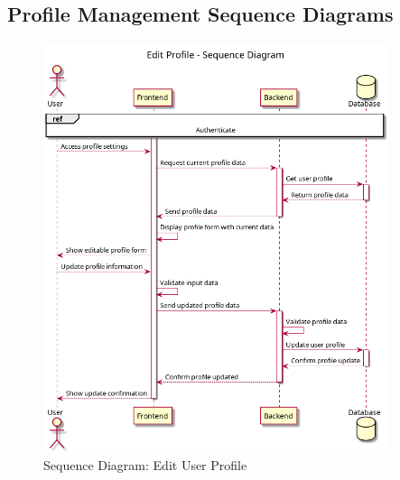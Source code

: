 \subsection{Profile Management Sequence Diagrams}

\begin{figure}[H]
\centering
\includegraphics[width=0.9\textwidth]{conception/SprintV/sequence_diagrams/sequence_profileManagement_7_1_EditUserProfile.png}
\caption{Sequence Diagram: Edit User Profile}
\label{fig:seq_edit_profile}
\end{figure}

